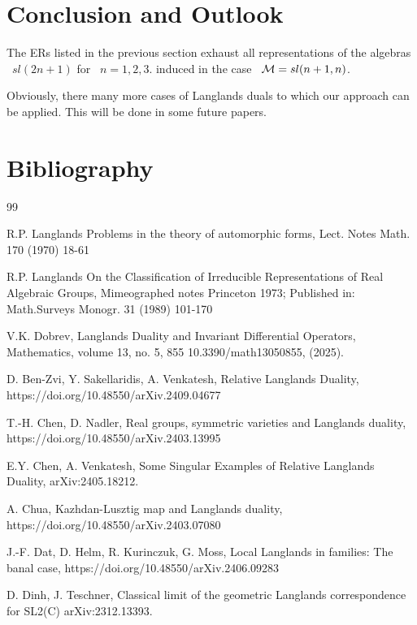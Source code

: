 \documentclass[a4paper]{jpconf}
\def\cm{{\cal M}} \def\cn{{\cal N}} \def\co{{\cal O}}
\begin{document}
\section*{Conclusion and Outlook}

The ERs listed in the previous section exhaust all  representations of the algebras ~$sl(2n+1)$ for ~$n=1,2,3$.
 induced in the case ~$\cm = sl(n+1,n)$.

Obviously, there many more cases of Langlands duals to which our approach  can be applied. This will be done in some future papers.


\section*{Bibliography}
\begin{thebibliography}{99} %
\medskip

  R.P. Langlands
 Problems in the theory of automorphic forms,
 Lect. Notes Math. 170 (1970) 18-61

  R.P. Langlands
 On the Classification of Irreducible Representations of Real Algebraic Groups,
 Mimeographed notes Princeton 1973; Published in: Math.Surveys Monogr. 31 (1989) 101-170


V.K. Dobrev, Langlands Duality and Invariant Differential Operators, Mathematics, volume 13, no. 5, 855
10.3390/math13050855, (2025).


  D. Ben-Zvi, Y.  Sakellaridis, A. Venkatesh,
Relative Langlands Duality,
 https://doi.org/10.48550/arXiv.2409.04677


  T.-H. Chen, D. Nadler,
Real groups, symmetric varieties and Langlands duality,
https://doi.org/10.48550/arXiv.2403.13995

 E.Y. Chen, A. Venkatesh,
Some Singular Examples of Relative Langlands Duality,
arXiv:2405.18212.

 A. Chua,
Kazhdan-Lusztig map and Langlands duality,
https://doi.org/10.48550/arXiv.2403.07080

 J.-F. Dat, D. Helm, R. Kurinczuk, G. Moss,
Local Langlands in families: The banal case,
https://doi.org/10.48550/arXiv.2406.09283

 D. Dinh, J. Teschner,
Classical limit of the geometric Langlands correspondence for SL2(C)
arXiv:2312.13393.  %







\end{thebibliography}
\end{document}
